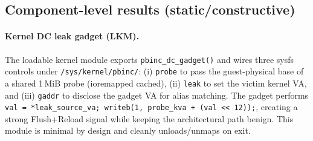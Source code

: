 \documentclass[11pt,a4paper]{article}
\begin{document}
\subsection{Component-level results (static/constructive)}
\paragraph{Kernel DC leak gadget (LKM).}
The loadable kernel module exports \texttt{pbinc\_dc\_gadget()} and wires three sysfs controls under \texttt{/sys/kernel/pbinc/}: (i) \texttt{probe} to pass the guest-physical base of a shared 1\,MiB probe (ioremapped cached), (ii) \texttt{leak} to set the victim kernel VA, and (iii) \texttt{gaddr} to disclose the gadget VA for alias matching. The gadget performs \texttt{val = *leak\_source\_va; writeb(1, probe\_kva + (val << 12));}, creating a strong Flush+Reload signal while keeping the architectural path benign. This module is minimal by design and cleanly unloads/unmaps on exit.\cite{wikner2025breaking,linux_srso_doc}
\end{document}
